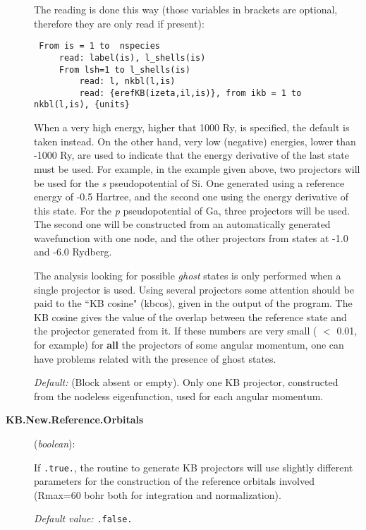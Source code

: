 \begin{description}
The reading is done this way (those variables in brackets are optional,
therefore they are only read if
present):

\begin{verbatim}
 From is = 1 to  nspecies
     read: label(is), l_shells(is)
     From lsh=1 to l_shells(is)
         read: l, nkbl(l,is)
         read: {erefKB(izeta,il,is)}, from ikb = 1 to nkbl(l,is), {units}
\end{verbatim}

When a very high energy, higher that 1000 Ry, is specified, the
default is taken instead.  On the other hand, very low (negative)
energies, lower than -1000 Ry, are used to indicate that the energy
derivative of the last state must be used. For example, in the example
given above, two projectors will be used for the \textit{s}
pseudopotential of Si. One generated using a reference energy of -0.5
Hartree, and the second one using the energy derivative of this
state. For the \textit{p} pseudopotential of Ga, three projectors will be
used.  The second one will be constructed from an automatically
generated wavefunction with one node, and the other projectors from
states at -1.0 and -6.0 Rydberg.

The analysis looking for possible \textit{ghost} states is only performed
when a single projector is used.  Using several projectors some
attention should be paid to the ``KB cosine" (kbcos), given in the
output of the program.  The KB cosine gives the value of the overlap
between the reference state and the projector generated from it.  If
these numbers are very small ( $<$ 0.01, for example) for \textbf{all}
the projectors of some angular momentum, one can have problems related
with the presence of ghost states.

\textit{Default:} (Block absent or empty). Only one KB projector,
constructed from the nodeless eigenfunction, used for each angular
momentum.
\noindent

\item[\textbf{KB.New.Reference.Orbitals}] (\textit{boolean}):

If \texttt{.true.}, the routine to generate KB projectors will use
slightly different parameters for the construction of the reference
orbitals involved (Rmax=60 bohr both for integration and
normalization).

\textit{Default value:} \texttt{.false.}

\end{description}


